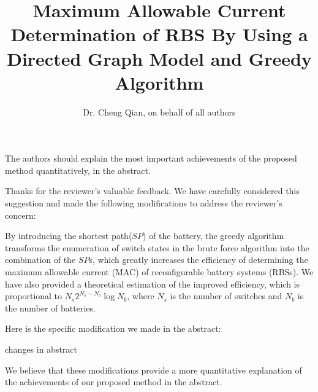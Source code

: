 \documentclass[12pt,american]{scrartcl}
\title{Maximum Allowable Current Determination of RBS By Using a Directed Graph Model and Greedy Algorithm}
\author{Dr. Cheng Qian, on behalf of all authors}
\begin{document}
\maketitle




\reviewer
\begin{revcomment}
  The authors should explain the most important achievements of the proposed method quantitatively, in the abstract.
\end{revcomment}
\begin{revresponse}

Thanks for the reviewer's valuable feedback. We have carefully considered this suggestion and made the following modifications to address the reviewer's concern:


By introducing the shortest path($SP$) of the battery, the greedy algorithm transforms the enumeration of switch states in the brute force algorithm into the combination of the $SP$s, which greatly increases the efficiency of determining the maximum allowable current (MAC) of reconfigurable battery systems (RBSs). We have also provided a theoretical estimation of the improved efficiency, which is proportional to $N_s 2^{N_s - N_b} \log N_b$, where $N_s$ is the number of switches and $N_b$ is the number of batteries.


Here is the specific modification we made in the abstract:
\begin{changes}
  changes in abstract
\end{changes}


We believe that these modifications provide a more quantitative explanation of the achievements of our proposed method in the abstract. 

\end{revresponse}
\end{document}
